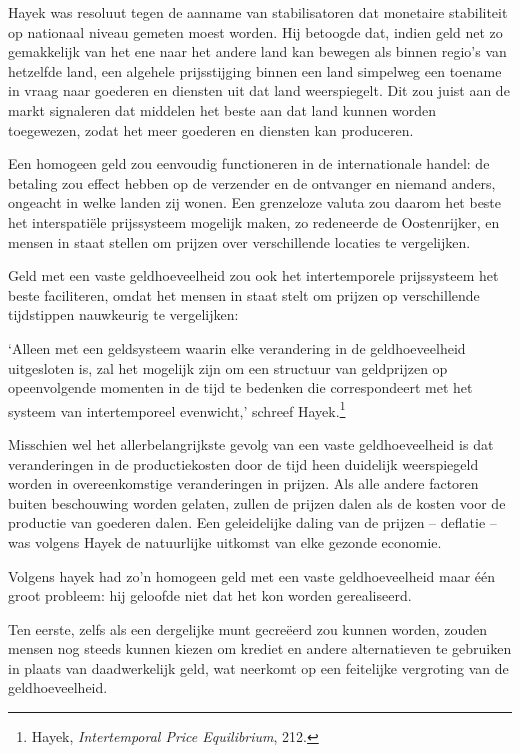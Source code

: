 \documentclass[
  a5paper,
  smalldemyvopaper,11pt,twoside,onecolumn,openright,extrafontsizes,
hidelinks]{memoir}
\begin{document}
Hayek was resoluut tegen de aanname van stabilisatoren dat monetaire
stabiliteit op nationaal niveau gemeten moest worden. Hij betoogde dat,
indien geld net zo gemakkelijk van het ene naar het andere land kan
bewegen als binnen regio's van hetzelfde land, een algehele
prijsstijging binnen een land simpelweg een toename in vraag naar
goederen en diensten uit dat land weerspiegelt. Dit zou juist aan de
markt signaleren dat middelen het beste aan dat land kunnen worden
toegewezen, zodat het meer goederen en diensten kan produceren.

Een homogeen geld zou eenvoudig functioneren in de internationale
handel: de betaling zou effect hebben op de verzender en de ontvanger en
niemand anders, ongeacht in welke landen zij wonen. Een grenzeloze
valuta zou daarom het beste het interspatiële prijssysteem mogelijk
maken, zo redeneerde de Oostenrijker, en mensen in staat stellen om
prijzen over verschillende locaties te vergelijken.

Geld met een vaste geldhoeveelheid zou ook het intertemporele
prijssysteem het beste faciliteren, omdat het mensen in staat stelt om
prijzen op verschillende tijdstippen nauwkeurig te vergelijken:

`Alleen met een geldsysteem waarin elke verandering in de
geldhoeveelheid uitgesloten is, zal het mogelijk zijn om een structuur
van geldprijzen op opeenvolgende momenten in de tijd te bedenken die
correspondeert met het systeem van intertemporeel evenwicht,' schreef
Hayek.\footnote{\hspace{0pt}Hayek, \emph{Intertemporal Price
  Equilibrium}, 212.}

Misschien wel het allerbelangrijkste gevolg van een vaste
geldhoeveelheid is dat veranderingen in de productiekosten door de tijd
heen duidelijk weerspiegeld worden in overeenkomstige veranderingen in
prijzen. Als alle andere factoren buiten beschouwing worden gelaten,
zullen de prijzen dalen als de kosten voor de productie van goederen
dalen. Een geleidelijke daling van de prijzen -- deflatie -- was volgens
Hayek de natuurlijke uitkomst van elke gezonde economie.

Volgens hayek had zo'n homogeen geld met een vaste geldhoeveelheid maar
één groot probleem: hij geloofde niet dat het kon worden gerealiseerd.

Ten eerste, zelfs als een dergelijke munt gecreëerd zou kunnen worden,
zouden mensen nog steeds kunnen kiezen om krediet en andere
alternatieven te gebruiken in plaats van daadwerkelijk geld, wat
neerkomt op een feitelijke vergroting van de geldhoeveelheid.
\end{document}
